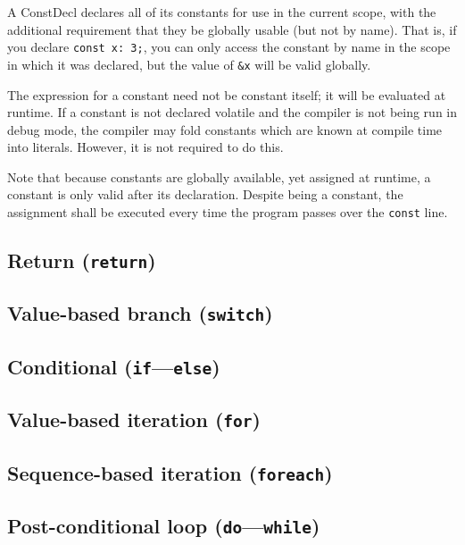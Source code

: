 \documentclass{article}
\begin{document}
A ConstDecl declares all of its constants for use in the current scope, with the
additional requirement that they be globally usable (but not by name). That is,
if you declare \texttt{const~x:~3;}, you can only access the constant by name in
the scope in which it was declared, but the value of \texttt{\&x} will be valid
globally.

The expression for a constant need not be constant itself; it will be evaluated
at runtime. If a constant is not declared volatile and the compiler is not being
run in debug mode, the compiler may fold constants which are known at compile time
into literals. However, it is not required to do this.

Note that because constants are globally available, yet assigned at runtime, a
constant is only valid after its declaration. Despite being a constant, the
assignment shall be executed every time the program passes over the \texttt{const}
line.

\subsection{Return (\texttt{return})}
\label{sub:statements:return}

\subsection{Value-based branch (\texttt{switch})}
\label{sub:statements:switch}

\subsection{Conditional (\texttt{if}---\texttt{else})}
\label{sub:statements:if}

\subsection{Value-based iteration (\texttt{for})}
\label{sub:statements:for}

\subsection{Sequence-based iteration (\texttt{foreach})}
\label{sub:statements:foreach}

\subsection{Post-conditional loop (\texttt{do}---\texttt{while})}
\label{sub:statements:do}
\end{document}
